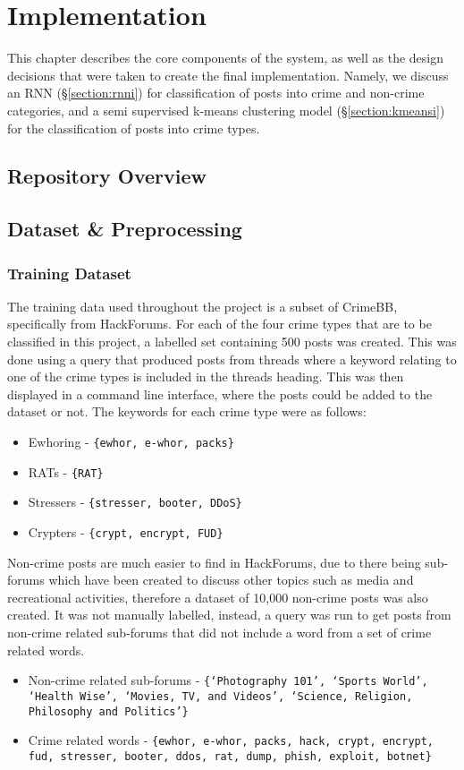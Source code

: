 \documentclass[12pt,a4paper,twoside,openright]{report}
\begin{document}
\chapter{Implementation}
\label{chapter:implementation}
This chapter describes the core components of the system, as well as the design decisions that were taken to create the final implementation. Namely, we discuss an RNN (\S\ref{section:rnni}) for classification of posts into crime and non-crime categories, and a semi supervised k-means clustering model (\S\ref{section:kmeansi}) for the classification of posts into crime types. 

\section{Repository Overview}
\section{Dataset \& Preprocessing}
\subsection{Training Dataset} \label{section:dataset}
The training data used throughout the project is a subset of CrimeBB, specifically from HackForums. For each of the four crime types that are to be classified in this project, a labelled set containing 500 posts was created. This was done using a query that produced posts from threads where a keyword relating to one of the crime types is included in the threads heading. This was then displayed in a command line interface, where the posts could be added to the dataset or not. The keywords for each crime type were as follows:
\begin{itemize}
    \item Ewhoring - \texttt{\{ewhor, e-whor, packs\}}
    \item RATs - \texttt{\{RAT\}}
    \item Stressers - \texttt{\{stresser, booter, DDoS\}}
    \item Crypters - \texttt{\{crypt, encrypt, FUD\}}
\end{itemize}

 
Non-crime posts are much easier to find in HackForums, due to there being sub-forums which have been created to discuss other topics such as media and recreational activities, therefore a dataset of 10,000 non-crime posts was also created. It was not manually labelled, instead, a query was run to get posts from non-crime related sub-forums that did not include a word from a set of crime related words.
\begin{itemize}
    \item Non-crime related sub-forums - \texttt{\{`Photography 101', `Sports World', `Health Wise', `Movies, TV, and Videos', `Science, Religion, Philosophy and Politics'\}}
    \item Crime related words - \texttt{\{ewhor, e-whor, packs, hack, crypt, encrypt, fud, stresser, booter, ddos, rat, dump, phish, exploit, botnet\}}
\end{itemize}
 
\end{document}
